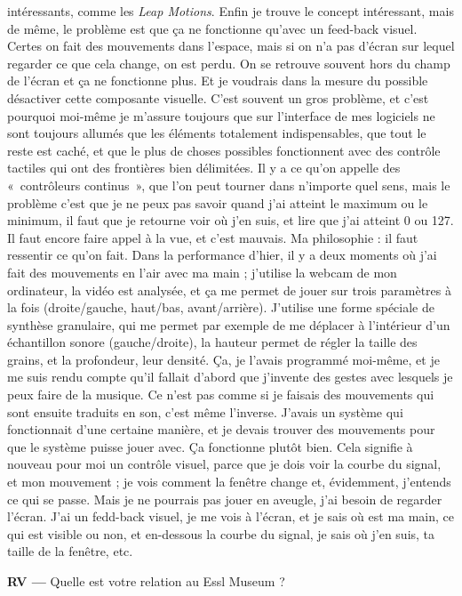 \documentclass[a4paper,12pt]{article}
\newcommand{\guill}[1]{«~#1~»}
\begin{document}
intéressants, comme les \emph{Leap Motions}. Enfin je trouve le concept intéressant, mais de même, le problème est que ça ne fonctionne qu'avec un feed-back visuel. Certes on fait des mouvements dans l'espace, mais si on n'a pas d'écran sur lequel regarder ce que cela change, on est perdu. On se retrouve souvent hors du champ de l'écran et ça ne fonctionne plus. Et je voudrais dans la mesure du possible désactiver cette composante visuelle. C'est souvent un gros problème, et c'est pourquoi moi-même je m'assure toujours que sur l'interface de mes logiciels ne sont toujours allumés que les éléments totalement indispensables, que tout le reste est caché, et que le plus de choses possibles fonctionnent avec des contrôle tactiles qui ont des frontières bien délimitées. Il y a ce qu'on appelle des \guill{contrôleurs continus}, que l'on peut tourner dans n'importe quel sens, mais le problème c'est que je ne peux pas savoir quand j'ai atteint le maximum ou le minimum, il faut que je retourne voir où j'en suis, et lire que j'ai atteint 0 ou 127. Il faut encore faire appel à la vue, et c'est mauvais. Ma philosophie : il faut ressentir ce qu'on fait. Dans la performance d'hier, il y a deux moments où j'ai fait des mouvements en l'air avec ma main ; j'utilise la webcam de mon ordinateur, la vidéo est analysée, et ça me permet de jouer sur trois paramètres à la fois (droite/gauche, haut/bas, avant/arrière). J'utilise une forme spéciale de synthèse granulaire, qui me permet par exemple de me déplacer à l'intérieur d'un échantillon sonore (gauche/droite), la hauteur permet de régler la taille des grains, et la profondeur, leur densité. Ça, je l'avais programmé moi-même, et je me suis rendu compte qu'il fallait d'abord que j'invente des gestes avec lesquels je peux faire de la musique. Ce n'est pas comme si je faisais des mouvements qui sont ensuite traduits en son, c'est même l'inverse. J'avais un système qui fonctionnait d'une certaine manière, et je devais trouver des mouvements pour que le système puisse jouer avec. Ça fonctionne plutôt bien. Cela signifie à nouveau pour moi un contrôle visuel, parce que je dois voir la courbe du signal, et mon mouvement ; je vois comment la fenêtre change et, évidemment, j'entends ce qui se passe. Mais je ne pourrais pas jouer en aveugle, j'ai besoin de regarder l'écran. J'ai un fedd-back visuel, je me vois à l'écran, et je sais où est ma main, ce qui est visible ou non, et en-dessous la courbe du signal, je sais où j'en suis, ta taille de la fenêtre, etc.

\textbf{RV ---} Quelle est votre relation au Essl Museum ?
\end{document}
